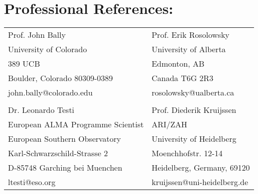 

\section*{Professional References: }

\begin{tabular}{ll}
Prof. John Bally&                    Prof. Erik Rosolowsky   \\
University of Colorado&              University of Alberta   \\
389 UCB &                            Edmonton, AB            \\
Boulder, Colorado 80309-0389 &       Canada T6G 2R3          \\
john.bally@colorado.edu   &           rosolowsky@ualberta.ca \\
                                                            &\\
  Dr. Leonardo Testi                 & Prof. Diederik Kruijssen       \\
  European ALMA Programme Scientist  & ARI/ZAH \\
  European Southern Observatory      & University of Heidelberg \\
  Karl-Schwarzschild-Strasse 2       & Moenchhofstr. 12-14 \\
  D-85748 Garching bei Muenchen      & Heidelberg, Germany, 69120 \\
 ltesti@eso.org                      & kruijssen@uni-heidelberg.de \\


\end{tabular}
